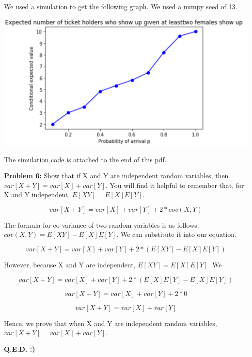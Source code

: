 \documentclass{article}
\begin{document}
 We used a simulation to get the following graph. We used a numpy seed of 13.\newline
 
 \includegraphics{HW4_5.PNG}
 
 The simulation code is attached to the end of this pdf.\newline
 
 \newpage
 
 \begin{center}
     \Large\textbf{Problem 6:} Show that if X and Y are independent random variables, then $var[X+Y] = var[X] + var[Y]$. You will find it helpful to remember that, for X and Y independent, $E[XY] = E[X]E[Y]$.\par
 \end{center}
 
 \begin{equation}
    var[X+Y] = var[X] + var[Y] + 2*cov(X,Y)
 \end{equation}
 
 The formula for co-variance of two random variables is as follows: $cov(X,Y)=E[XY]-E[X]E[Y]$. We can substitute it into our equation.
 
 \begin{equation}
    var[X+Y] = var[X] + var[Y] + 2*(E[XY]-E[X]E[Y])
 \end{equation}
 
 However, because X and Y are independent, $E[XY]=E[X]E[Y]$. We 
 
 \begin{equation}
    var[X+Y] = var[X] + var[Y] + 2*(E[X]E[Y]-E[X]E[Y])
 \end{equation}
 
 \begin{equation}
    var[X+Y] = var[X] + var[Y] + 2*0
 \end{equation}
 
 \begin{equation}
    var[X+Y] = var[X] + var[Y]
 \end{equation}
 
 Hence, we prove that when X and Y are independent random variables, $var[X+Y]=var[X]+var[Y]$.
 
 \begin{center}
      \Large\textbf{Q.E.D. :)}
 \end{center}
 
 
\end{document}
